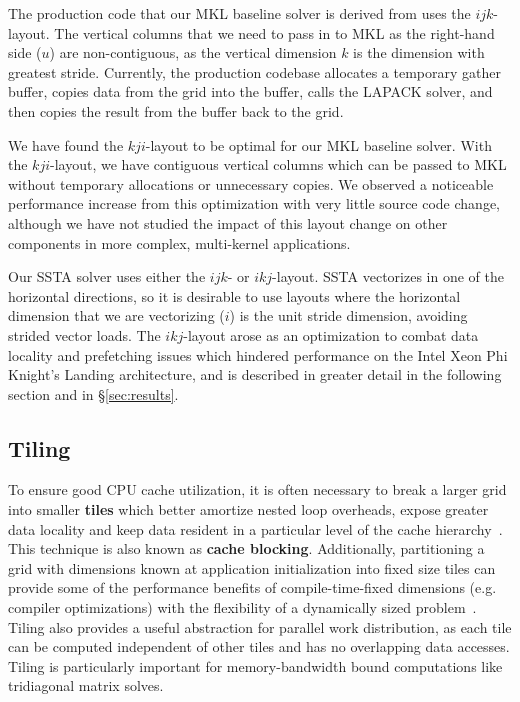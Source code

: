 \documentclass[10pt, conference, compsocconf]{IEEEtran}
\begin{document}
The production code that our MKL baseline solver is derived from uses the
  \(ijk\)-layout.
The vertical columns that we need to pass in to MKL as the right-hand side
  (\(u\)) are non-contiguous, as the vertical dimension \(k\) is the dimension
  with greatest stride.
Currently, the production codebase allocates a temporary gather buffer, copies
  data from the grid into the buffer, calls the LAPACK solver, and then copies
  the result from the buffer back to the grid.

We have found the \(kji\)-layout to be optimal for our MKL baseline solver.
With the \(kji\)-layout, we have contiguous vertical columns which can be
  passed to MKL without temporary allocations or unnecessary copies.
We observed a noticeable performance increase from this optimization with very
  little source code change, although we have not studied the impact of this
  layout change on other components in more complex, multi-kernel applications.

Our SSTA solver uses either the \(ijk\)- or \(ikj\)-layout.
SSTA vectorizes in one of the horizontal directions, so it is
  desirable to use layouts where the horizontal dimension that we are
  vectorizing (\(i\)) is the unit stride dimension, avoiding strided vector loads.
The \(ikj\)-layout arose as an optimization to combat data locality and
  prefetching issues which hindered performance on the Intel Xeon Phi Knight's
  Landing architecture, and is described in greater detail in the following
  section and in \S\ref{sec:results}.

\subsection{Tiling}
\label{sec:impl:tiling}

To ensure good CPU cache utilization, it is often necessary to break a larger
  grid into smaller \textbf{tiles} which better amortize nested loop overheads, expose
  greater data locality and keep data resident in a particular level of the
  cache hierarchy~\cite{cache_blocking}.
This technique is also known as \textbf{cache blocking}.
Additionally, partitioning a grid with dimensions known at application
  initialization into fixed size tiles can provide some of the performance
  benefits of compile-time-fixed dimensions (e.g. compiler optimizations) with
  the flexibility of a dynamically sized problem~\cite{kokkos}.
Tiling also provides a useful abstraction for parallel work distribution, as
  each tile can be computed independent of other tiles and has no overlapping
  data accesses.
Tiling is particularly important for memory-bandwidth bound computations like
  tridiagonal matrix solves.
\end{document}
